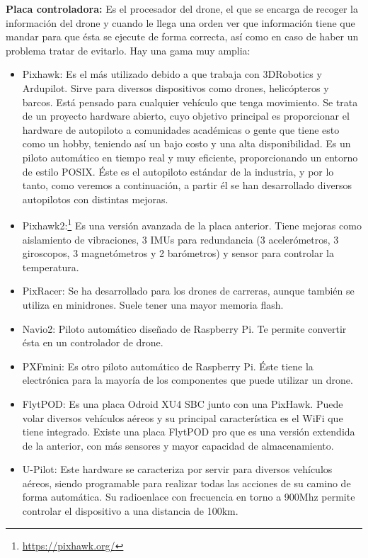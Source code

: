 \hspace{1 cm}\textbf{Placa controladora:} Es el procesador del drone, el que se encarga de recoger la informaci\'on del drone y cuando le llega una orden ver que informaci\'on tiene que mandar para que \'esta se ejecute de forma correcta, as\'i como en caso de haber un problema tratar de evitarlo. Hay una gama muy amplia:
	\begin{itemize}
		\item Pixhawk: Es el m\'as utilizado debido a que trabaja con 3DRobotics y Ardupilot. Sirve para diversos dispositivos como drones, helic\'opteros y barcos. Est\'a pensado para cualquier veh\'iculo que tenga movimiento. Se trata de un proyecto hardware abierto, cuyo objetivo principal es proporcionar el hardware de autopiloto a comunidades acad\'emicas o gente que tiene esto como un hobby, teniendo as\'i un bajo costo y una alta disponibilidad. Es un piloto autom\'atico en tiempo real y muy eficiente, proporcionando un entorno de estilo POSIX. \'Este es el autopiloto est\'andar de la industria, y por lo tanto, como veremos a continuaci\'on, a partir \'el se han desarrollado diversos autopilotos con distintas mejoras. 

		\item Pixhawk2:\footnote{\url{https://pixhawk.org/}} Es una versi\'on avanzada de la placa anterior. Tiene mejoras como aislamiento de vibraciones, 3 IMUs para redundancia (3 aceler\'ometros, 3 giroscopos, 3 magnet\'ometros y 2 bar\'ometros) y sensor para controlar la temperatura. 

		\item PixRacer: Se ha desarrollado para los drones de carreras, aunque tambi\'en se utiliza en minidrones. Suele tener una mayor memoria flash.

		\item Navio2: Piloto autom\'atico diseñado de Raspberry Pi. Te permite convertir \'esta en un controlador de drone. 

		\item PXFmini: Es otro piloto autom\'atico de Raspberry Pi. \'Este tiene la electr\'onica para la mayor\'ia de los componentes que puede utilizar un drone. 

		\item FlytPOD: Es una placa Odroid XU4 SBC junto con una PixHawk. Puede volar diversos veh\'iculos a\'ereos y su principal caracter\'istica es el WiFi que tiene integrado. Existe una placa FlytPOD pro que es una versi\'on extendida de la anterior, con m\'as sensores y mayor capacidad de almacenamiento. 

		\item U-Pilot: Este hardware se caracteriza por servir para diversos veh\'iculos a\'ereos, siendo programable para realizar todas las acciones de su camino de forma autom\'atica. Su radioenlace con frecuencia en torno a 900Mhz permite controlar el dispositivo a una distancia de 100km. 
	\end{itemize}

